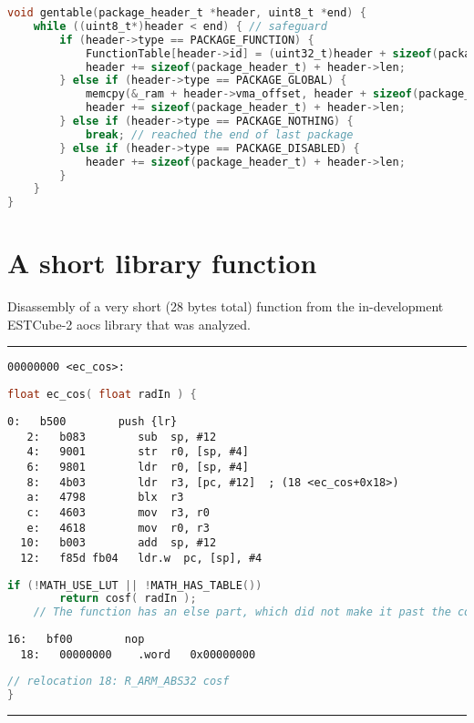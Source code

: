 \begin{appendices}
\begin{lstlisting}[language=C]
void gentable(package_header_t *header, uint8_t *end) {
	while ((uint8_t*)header < end) { // safeguard
		if (header->type == PACKAGE_FUNCTION) {
			FunctionTable[header->id] = (uint32_t)header + sizeof(package_header_t) + 1; // ARM Thumb jumps need odd addresses
			header += sizeof(package_header_t) + header->len;
		} else if (header->type == PACKAGE_GLOBAL) {
			memcpy(&_ram + header->vma_offset, header + sizeof(package_header_t), header->len);
			header += sizeof(package_header_t) + header->len;
		} else if (header->type == PACKAGE_NOTHING) {
			break; // reached the end of last package
		} else if (header->type == PACKAGE_DISABLED) {
			header += sizeof(package_header_t) + header->len;
		}
	}
}
\end{lstlisting}

\newpage
\section{A short library function}
\label{apx:cos}

Disassembly of a very short (28 bytes total) function from the in-development ESTCube-2 \gls{aocs} library that was analyzed.

\rule{\textwidth}{0.4pt}
\begin{lstlisting}[style=asm,frame=none]
00000000 <ec_cos>:
\end{lstlisting}
\begin{lstlisting}[language=C,frame=none]
float ec_cos( float radIn ) {
\end{lstlisting}
\begin{lstlisting}[style=asm,frame=none]
   0:	b500      	push {lr}
   2:	b083      	sub  sp, #12
   4:	9001      	str  r0, [sp, #4]
   6:	9801      	ldr  r0, [sp, #4]
   8:	4b03      	ldr  r3, [pc, #12]	; (18 <ec_cos+0x18>)
   a:	4798      	blx  r3
   c:	4603      	mov  r3, r0
   e:	4618      	mov  r0, r3
  10:	b003      	add  sp, #12
  12:	f85d fb04 	ldr.w  pc, [sp], #4
\end{lstlisting}
\begin{lstlisting}[language=C,frame=none]
	if (!MATH_USE_LUT || !MATH_HAS_TABLE())
		return cosf( radIn );
	// The function has an else part, which did not make it past the compilation step due to the shown preprocessor constants
\end{lstlisting}
\begin{lstlisting}[style=asm,frame=none]
  16:	bf00      	nop
  18:	00000000 	.word	0x00000000
\end{lstlisting}
\begin{lstlisting}[language=C,frame=none]
  // relocation 18: R_ARM_ABS32	cosf
}
\end{lstlisting}
\rule{\textwidth}{0.4pt}



\end{appendices}
